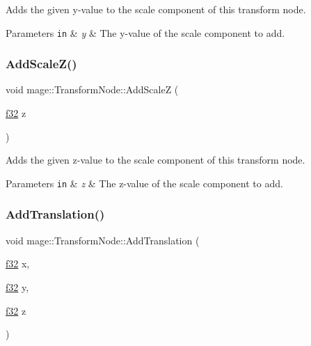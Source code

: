 Adds the given y-\/value to the scale component of this transform node.


\begin{DoxyParams}[1]{Parameters}
\mbox{\tt in}  & {\em y} & The y-\/value of the scale component to add. \\
\hline
\end{DoxyParams}
\hypertarget{structmage_1_1_transform_node_a0f0eb2af13b736e0e87aaaf1ae96e95c}{}\label{structmage_1_1_transform_node_a0f0eb2af13b736e0e87aaaf1ae96e95c} 
\subsubsection{\texorpdfstring{Add\+Scale\+Z()}{AddScaleZ()}}
{\footnotesize\ttfamily void mage\+::\+Transform\+Node\+::\+Add\+ScaleZ (\begin{DoxyParamCaption}\item[{\hyperlink{namespacemage_a6a44ad388483959dc4dff9f2aef91431}{f32}}]{z }\end{DoxyParamCaption})\hspace{0.3cm}{\ttfamily [noexcept]}}

Adds the given z-\/value to the scale component of this transform node.


\begin{DoxyParams}[1]{Parameters}
\mbox{\tt in}  & {\em z} & The z-\/value of the scale component to add. \\
\hline
\end{DoxyParams}
\hypertarget{structmage_1_1_transform_node_a259622ca48584c04b665a0956f644276}{}\label{structmage_1_1_transform_node_a259622ca48584c04b665a0956f644276} 
\subsubsection{\texorpdfstring{Add\+Translation()}{AddTranslation()}\hspace{0.1cm}{\footnotesize\ttfamily [1/3]}}
{\footnotesize\ttfamily void mage\+::\+Transform\+Node\+::\+Add\+Translation (\begin{DoxyParamCaption}\item[{\hyperlink{namespacemage_a6a44ad388483959dc4dff9f2aef91431}{f32}}]{x,  }\item[{\hyperlink{namespacemage_a6a44ad388483959dc4dff9f2aef91431}{f32}}]{y,  }\item[{\hyperlink{namespacemage_a6a44ad388483959dc4dff9f2aef91431}{f32}}]{z }\end{DoxyParamCaption})\hspace{0.3cm}{\ttfamily [noexcept]}}

